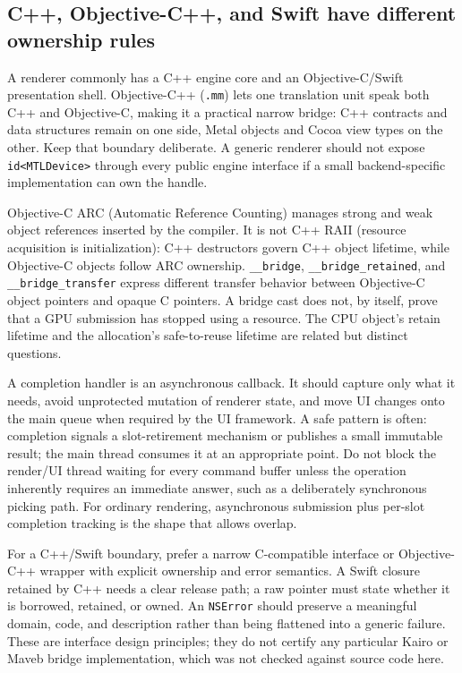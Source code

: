 \subsection{C++, Objective-C++, and Swift have different ownership rules}\label{c-objective-c-and-swift-have-different-ownership-rules}

A renderer commonly has a C++ engine core and an Objective-C/Swift presentation shell. Objective-C++ (\texttt{.mm}) lets one translation unit speak both C++ and Objective-C, making it a practical narrow bridge: C++ contracts and data structures remain on one side, Metal objects and Cocoa view types on the other. Keep that boundary deliberate. A generic renderer should not expose \texttt{id\textless{}MTLDevice\textgreater{}} through every public engine interface if a small backend-specific implementation can own the handle.

Objective-C ARC (Automatic Reference Counting) manages strong and weak object references inserted by the compiler. It is not C++ RAII (resource acquisition is initialization): C++ destructors govern C++ object lifetime, while Objective-C objects follow ARC ownership. \texttt{\_\_bridge}, \texttt{\_\_bridge\_retained}, and \texttt{\_\_bridge\_transfer} express different transfer behavior between Objective-C object pointers and opaque C pointers. A bridge cast does not, by itself, prove that a GPU submission has stopped using a resource. The CPU object's retain lifetime and the allocation's safe-to-reuse lifetime are related but distinct questions.

A completion handler is an asynchronous callback. It should capture only what it needs, avoid unprotected mutation of renderer state, and move UI changes onto the main queue when required by the UI framework. A safe pattern is often: completion signals a slot-retirement mechanism or publishes a small immutable result; the main thread consumes it at an appropriate point. Do not block the render/UI thread waiting for every command buffer unless the operation inherently requires an immediate answer, such as a deliberately synchronous picking path. For ordinary rendering, asynchronous submission plus per-slot completion tracking is the shape that allows overlap.

For a C++/Swift boundary, prefer a narrow C-compatible interface or Objective-C++ wrapper with explicit ownership and error semantics. A Swift closure retained by C++ needs a clear release path; a raw pointer must state whether it is borrowed, retained, or owned. An \texttt{NSError} should preserve a meaningful domain, code, and description rather than being flattened into a generic failure. These are interface design principles; they do not certify any particular Kairo or Maveb bridge implementation, which was not checked against source code here.

